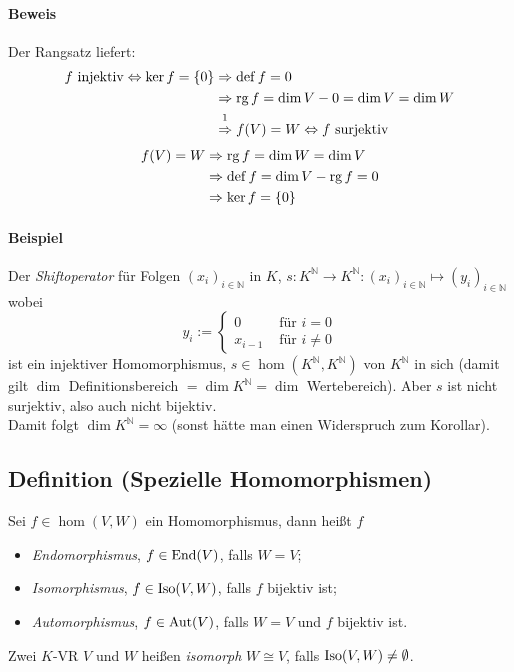 \paragraph{Beweis} 
	Der Rangsatz liefert:
	\begin{align*}
            f \text{ injektiv} \Leftrightarrow \ker f = \{{0\}} &\Rightarrow \dfkt f = 0\\
            &\Rightarrow \rg f = \dim V-0 = \dim V = \dim W\\
            &\stackrel{\footnotemark}{\Rightarrow} f(V) = W \Leftrightarrow f \text{ surjektiv}
        \end{align*}
        \begin{align*}
            f(V) = W &\Rightarrow \operatorname{rg} f = \dim W = \dim V\\
            &\Rightarrow \operatorname{def} f= \dim V - \operatorname{rg} f=0\\
            &\Rightarrow \ker f = \{{0}\}
	\end{align*}
	
\paragraph{Beispiel}
	Der \emph{Shiftoperator} für Folgen $(x_i)_{i\in \mathbb{N}}$ in $K$, $s: K^{\mathbb{N}} \to K^{\mathbb{N}}: (x_i)_{i\in \mathbb{N}} \mapsto (y_i)_{i\in \mathbb{N}}$ wobei
	\begin{equation*}
		y_i :=
		\begin{cases}
			0 &\text{ für } i = 0\\
			x_{i-1} &\text{ für } i \neq 0
		\end{cases}
	\end{equation*}
	ist ein injektiver Homomorphismus, $s\in \hom(K^\mathbb{N},K^\mathbb{N})$ von $K^\mathbb{N}$ in sich (damit gilt $\dim $ Definitionsbereich $= \dim K^\mathbb{N}= \dim$ Wertebereich). Aber $s$ ist nicht surjektiv, also auch nicht bijektiv.\\
        Damit folgt $\dim K^\mathbb{N} =\infty$ (sonst hätte man einen Widerspruch zum Korollar).
		
\subsection{Definition (Spezielle Homomorphismen)}
	\begin{Definition}
		Sei $f\in \hom(V,W)$ ein Homomorphismus, dann heißt $f$
	\begin{itemize}
		\item \emph{Endomorphismus}, $f\in \operatorname{End} (V)$, falls $W = V$;
		\item \emph{Isomorphismus}, $f\in \operatorname{Iso}(V,W)$, falls $f$ bijektiv ist;
		\item \emph{Automorphismus}, $f\in \operatorname{Aut}(V)$, falls $W=V$ und $f$ bijektiv ist.
	\end{itemize}
	
	Zwei $K$-VR $V$ und $W$ heißen \emph{isomorph} $W \cong V$, falls $\operatorname{Iso}(V,W) \neq \emptyset$.
	\end{Definition}

